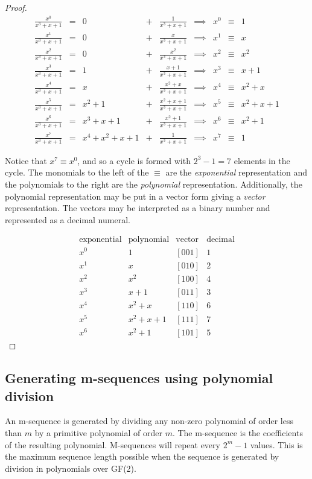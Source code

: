 \begin{proof}
\begin{align*}
   \frac{x^0}{x^3+x+1} &=& 0     &+& \frac{1  }{x^3+x+1}     &\implies& x^0 &\equiv& 1   \\
   \frac{x^1}{x^3+x+1} &=& 0     &+& \frac{x  }{x^3+x+1}     &\implies& x^1 &\equiv& x   \\
   \frac{x^2}{x^3+x+1} &=& 0     &+& \frac{x^2}{x^3+x+1}     &\implies& x^2 &\equiv& x^2 \\
   \frac{x^3}{x^3+x+1} &=& 1     &+& \frac{x+1}{x^3+x+1}     &\implies& x^3 &\equiv& x+1 \\
   \frac{x^4}{x^3+x+1} &=& x     &+& \frac{x^2+x}{x^3+x+1}   &\implies& x^4 &\equiv& x^2+x \\
   \frac{x^5}{x^3+x+1} &=& x^2+1 &+& \frac{x^2+x+1}{x^3+x+1} &\implies& x^5 &\equiv& x^2+x+1 \\
   \frac{x^6}{x^3+x+1} &=& x^3+x+1 &+& \frac{x^2+1}{x^3+x+1} &\implies& x^6 &\equiv& x^2+1 \\
   \frac{x^7}{x^3+x+1} &=& x^4+x^2+x+1 &+& \frac{1}{x^3+x+1} &\implies& x^7 &\equiv& 1
\end{align*}

Notice that $x^7\equiv x^0$, and so a cycle is formed with
$2^3-1=7$ elements in the cycle.
The monomials to the left of the $\equiv$ are the {\em exponential}
representation and the polynomials to the right are the {\em polynomial}
representation.
Additionally, the polynomial representation may be put in a vector form giving a
{\em vector} representation.
The vectors may be interpreted as a binary number and represented as a decimal numeral.

\[\begin{array}{cccc}
   \text{exponential} & \text{polynomial} & \text{vector} & \text{decimal} \\
   x^0 & 1       &[001] & 1  \\
   x^1 & x       &[010] & 2  \\
   x^2 & x^2     &[100] & 4  \\
   x^3 & x+1     &[011] & 3  \\
   x^4 & x^2+x   &[110] & 6  \\
   x^5 & x^2+x+1 &[111] & 7  \\
   x^6 & x^2+1   &[101] & 5
\end{array}\]
\end{proof}


\subsection{Generating m-sequences using polynomial division}
An m-sequence is generated by dividing any non-zero polynomial of order less than $m$
by a primitive polynomial of order $m$.
The m-sequence is the coefficients of the resulting polynomial.
M-sequences will repeat every $2^m-1$ values.
This is the maximum sequence length possible when the
sequence is generated by division in polynomials over GF(2).

